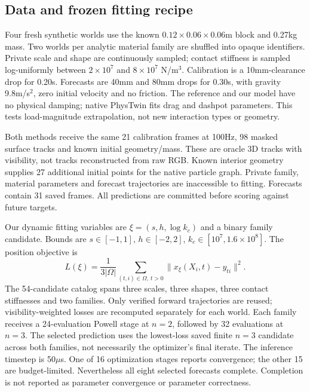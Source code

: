 \documentclass[10pt,twocolumn,letterpaper]{article}
\begin{document}
\subsection{Data and frozen fitting recipe}
Four fresh synthetic worlds use the known $0.12\times0.06\times0.06$m block and 0.27kg mass. Two worlds per analytic material family are shuffled into opaque identifiers. Private scale and shape are continuously sampled; contact stiffness is sampled log-uniformly between $2\times10^7$ and $8\times10^7$ N/m$^3$. Calibration is a 10mm-clearance drop for 0.20s. Forecasts are 40mm and 80mm drops for 0.30s, with gravity 9.8m/s$^2$, zero initial velocity and no friction. The reference and our model have no physical damping; native PhysTwin fits drag and dashpot parameters. This tests load-magnitude extrapolation, not new interaction types or geometry.

Both methods receive the same 21 calibration frames at 100Hz, 98 masked surface tracks and known initial geometry/mass. These are oracle 3D tracks with visibility, not tracks reconstructed from raw RGB. Known interior geometry supplies 27 additional initial points for the native particle graph. Private family, material parameters and forecast trajectories are inaccessible to fitting. Forecasts contain 31 saved frames. All predictions are committed before scoring against future targets.

Our dynamic fitting variables are $\xi=(s,h,\log k_c)$ and a binary family candidate. Bounds are $s\in[-1,1]$, $h\in[-2,2]$, $k_c\in[10^7,1.6\times10^8]$. The position objective is
\begin{equation}
 L(\xi)=\frac{1}{3|\Omega|}\sum_{(t,i)\in\Omega,\ t>0}\|x_\xi(X_i,t)-y_{ti}\|^2.
\end{equation}
The 54-candidate catalog spans three scales, three shapes, three contact stiffnesses and two families. Only verified forward trajectories are reused; visibility-weighted losses are recomputed separately for each world. Each family receives a 24-evaluation Powell stage at $n=2$, followed by 32 evaluations at $n=3$. The selected prediction uses the lowest-loss saved finite $n=3$ candidate across both families, not necessarily the optimizer's final iterate. The inference timestep is 50$\mu$s. One of 16 optimization stages reports convergence; the other 15 are budget-limited. Nevertheless all eight selected forecasts complete. Completion is not reported as parameter convergence or parameter correctness.
\end{document}
